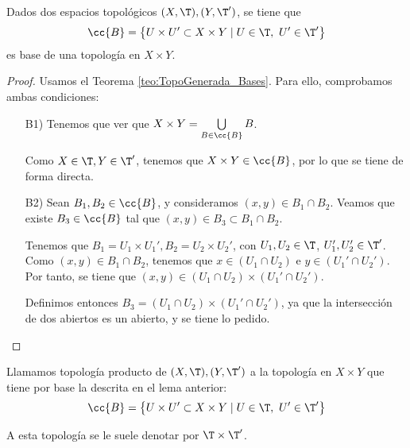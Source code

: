 \begin{lema}
    Dados dos espacios topológicos $(X,\T), (Y,\T')$, se tiene que
    \begin{equation*}
        \cc{B} = \left\{U\times U'\subset X\times Y\mid U\in \T,~U'\in \T'\right\}
    \end{equation*}
    es base de una topología en $X\times Y$.
\end{lema}
\begin{proof}
    Usamos el Teorema \ref{teo:TopoGenerada_Bases}. Para ello, comprobamos ambas condiciones:
    \begin{enumerate}
        \item[B1)] Tenemos que ver que $X\times Y=\bigcup\limits_{B\in \cc{B}}B$.

        Como $X\in \T, Y\in \T'$, tenemos que $X\times Y\in \cc{B}$, por lo que se tiene de forma directa.

        \item[B2)] Sean $B_1,B_2\in \cc{B}$, y consideramos $(x,y)\in B_1\cap B_2$. Veamos que existe $B_3\in \cc{B}$ tal que $(x,y)\in B_3\subset B_1\cap B_2$.

        Tenemos que $B_1=U_1\times U_1', B_2=U_2\times U_2'$, con $U_1,U_2\in \T$, $U_1', U_2'\in \T'$. Como $(x,y)\in B_1\cap B_2$, tenemos que $x\in (U_1\cap U_2)$ e $y\in (U_1'\cap U_2')$. Por tanto, se tiene que $(x,y)\in (U_1\cap U_2)\times (U_1'\cap U_2')$.
        
        Definimos entonces $B_3=(U_1\cap U_2)\times (U_1'\cap U_2')$, ya que la intersección de dos abiertos es un abierto, y se tiene lo pedido.
        \qedhere
    \end{enumerate}
\end{proof}

\begin{definicion}
    Llamamos topología producto de $(X,\T), (Y,\T')$ a la topología en $X\times Y$ que tiene por base la descrita en el lema anterior:
    \begin{equation*}
        \cc{B} = \left\{U\times U'\subset X\times Y\mid U\in \T,~U'\in \T'\right\}
    \end{equation*}

    A esta topología se le suele denotar por $\T\times \T'$.
\end{definicion}

